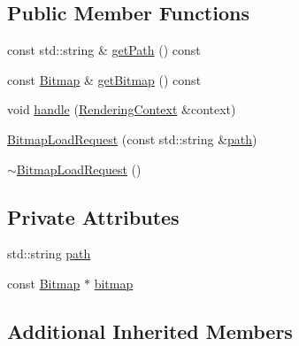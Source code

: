 \subsection*{Public Member Functions}
\begin{DoxyCompactItemize}
\item 
const std\+::string \& \hyperlink{classZeta_1_1SynchronousResourceContext_1_1BitmapLoadRequest_ab7cd162bdc01a896f43bb115b21c6503}{get\+Path} () const 
\item 
const \hyperlink{classZeta_1_1Bitmap}{Bitmap} \& \hyperlink{classZeta_1_1SynchronousResourceContext_1_1BitmapLoadRequest_a860dec69644bf5f78508285537b29796}{get\+Bitmap} () const 
\item 
void \hyperlink{classZeta_1_1SynchronousResourceContext_1_1BitmapLoadRequest_a1f89da097222c4dad665bdd6010919c8}{handle} (\hyperlink{classZeta_1_1RenderingContext}{Rendering\+Context} \&context)
\item 
\hyperlink{classZeta_1_1SynchronousResourceContext_1_1BitmapLoadRequest_ad1677ca9bf7b7f976e45e01b34f2a7a3}{Bitmap\+Load\+Request} (const std\+::string \&\hyperlink{classZeta_1_1SynchronousResourceContext_1_1BitmapLoadRequest_a4c4c292da6fd58426599a99034152002}{path})
\item 
\hyperlink{classZeta_1_1SynchronousResourceContext_1_1BitmapLoadRequest_a888d6fe21f82a92c74294200facdc9ff}{$\sim$\+Bitmap\+Load\+Request} ()
\end{DoxyCompactItemize}
\subsection*{Private Attributes}
\begin{DoxyCompactItemize}
\item 
std\+::string \hyperlink{classZeta_1_1SynchronousResourceContext_1_1BitmapLoadRequest_a4c4c292da6fd58426599a99034152002}{path}
\item 
const \hyperlink{classZeta_1_1Bitmap}{Bitmap} $\ast$ \hyperlink{classZeta_1_1SynchronousResourceContext_1_1BitmapLoadRequest_ae376e7355bdd78c46198009e88709c90}{bitmap}
\end{DoxyCompactItemize}
\subsection*{Additional Inherited Members}


